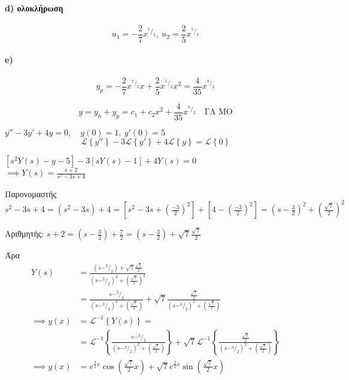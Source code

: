 \documentclass[11pt,a4paper,titlepage,final]{article}
\begin{document}
\begin{exercise*}{6.1}
	\paragraph{\textlatin{d}) ολοκλήρωση}
	\[
	u_1=-\frac{2}{7}x^{^7/_2},\ u_2=\frac{2}{5}x^{^5/_2}
	\]
	
	\paragraph{\textlatin{e})}
	\[
	y_p = -\frac{2}{7}x^{^7/_2}x + \frac{2}{5}x^{^5/_2}x^2 = \frac{4}{35}x^{^9/_2}
	\]
	
	\[
	\boxed{
		y=y_h+y_p=c_1+c_2x^2+\frac{4}{35}x^{^9/_2}
		} \quad \text{ΓΛ ΜΟ}
	\]
\end{exercise*}

\begin{exercise*}{12.4}
	\(y''-3y'+4y=0, \quad y(0)=1,\ y'(0)=5\)
	\tcblower
	\[
	\mathscr L \left\lbrace y'' \right\rbrace - 3\mathscr L\left\lbrace y' \right\rbrace
	+4\mathscr L\left\lbrace y \right\rbrace = \mathscr L\left\lbrace 0 \right\rbrace
	\]
	
	\( \left[s^2Y(s)-y-5\right] -3\left[sY(s)-1 \right] + 4Y(s) = 0\) \\
	\( \implies Y(s) = \frac{s+2}{s^2-3s+4} \)
	
    Παρονομαστής \( s^2-3s+4 = (s^2-3s)+4 = \left[ s^2-3s+\left(
    \frac{-3}{2}
    \right)^2 \right] + 
    \left[ 4-\left(
    \frac{-3}{2}
    \right)^2 \right] = \left(
    s-\frac{3}{2}
    \right)^2 + \left(\frac{\sqrt{7}}{2}\right)^2
    \)
    
    Αριθμητής: \( s+2 = \left(s-\frac{3}{2}\right) + \frac{7}{2} 
    = \left(s-\frac{3}{2}\right)+ \sqrt{7}\frac{\sqrt{7}}{2}
    \)
    
    Άρα \begin{align*} 
    Y(s) &= \frac{(s-^3/_2)+\sqrt{7}\frac{\sqrt{7}}{2}}{(s-^3/_2)^2+\left(\frac{\sqrt{7}}{2}\right)^2}
    \\ &=
    \frac{s-^3/_2}{(s- ^3/_2)^2+\left(\frac{\sqrt{7}}{2}\right)}+\sqrt{7}\frac{\frac{\sqrt{7}}{2}}{(s-^3/_2)^2+\left(\frac{\sqrt{7}}{2}\right)} \\
    \implies y(x) &= \mathscr L^{-1} \left\lbrace Y(s) \right\rbrace = \\
    &= \mathscr L^{-1}\left\lbrace 
    \frac{s-^3/_2}{(s- ^3/_2)^2+\left(\frac{\sqrt{7}}{2}\right)}
    \right\rbrace + \sqrt{7} \mathscr L^{-1} \left\lbrace 
    \frac{\frac{\sqrt{7}}{2}}{(s-^3/_2)^2+\left(\frac{\sqrt{7}}{2}\right)}
     \right\rbrace \\
     \implies y(x) &= e^{\frac{3}{2}x}\cos(\frac{\sqrt{7}}{2}x)+\sqrt{7}e^{\frac{3}{2}x}\sin(\frac{\sqrt{7}}{2}x)
     \end{align*}
\end{exercise*}
\end{document}
